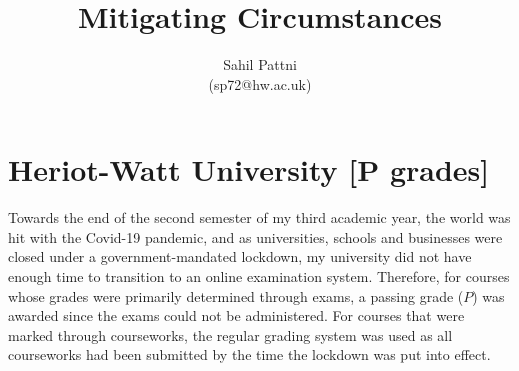 \documentclass[a4paper,11pt]{article}
\begin{document}
\title{Mitigating Circumstances}

\author{Sahil Pattni\\(sp72@hw.ac.uk)}
\date{}
\maketitle

\section*{Heriot-Watt University [P grades]}
Towards the end of the second semester of my third academic year, the world was hit with the Covid-19 pandemic, and as universities, schools and businesses were closed under a government-mandated lockdown, my university did not have enough time to transition to an online examination system. Therefore, for courses whose grades were primarily determined through exams, a passing grade ($P$) was awarded since the exams could not be administered. For courses that were marked through courseworks, the regular grading system was used as all courseworks had been submitted by the time the lockdown was put into effect.
\end{document}
